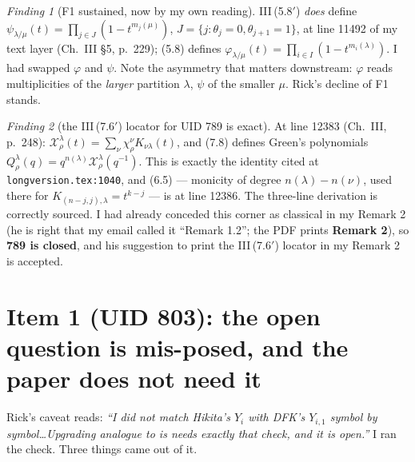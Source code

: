 \documentclass[11pt]{article}
\theoremstyle{remark}
\newtheorem{finding}{Finding}
\begin{document}
\begin{finding}[F1 sustained, now by my own reading]
\textrm{III}\,(5.8$'$) \emph{does} define $\psi_{\lambda/\mu}(t)=\prod_{j\in
J}(1-t^{m_j(\mu)})$, $J=\{j:\theta_j=0,\theta_{j+1}=1\}$, at line 11492 of my text layer
(Ch.~III \S5, p.~229); (5.8) defines $\varphi_{\lambda/\mu}(t)=\prod_{i\in
I}(1-t^{m_i(\lambda)})$. I had swapped $\varphi$ and $\psi$. Note the asymmetry that matters
downstream: $\varphi$ reads multiplicities of the \emph{larger} partition $\lambda$, $\psi$ of
the smaller $\mu$. Rick's decline of F1 stands.
\end{finding}

\begin{finding}[the \textrm{III}\,(7.6$'$) locator for UID 789 is exact]
At line 12383 (Ch.~III, p.~248): $\mathcal X^\lambda_\rho(t)=\sum_\nu\chi^\nu_\rho
K_{\nu\lambda}(t)$, and (7.8) defines Green's polynomials
$Q^\lambda_\rho(q)=q^{n(\lambda)}\mathcal X^\lambda_\rho(q^{-1})$. This is exactly the identity
cited at \texttt{longversion.tex:1040}, and (6.5) --- monicity of degree
$n(\lambda)-n(\nu)$, used there for $K_{(n-j,j),\lambda}=t^{k-j}$ --- is at line 12386. The
three-line derivation is correctly sourced. I had already conceded this corner as classical in
my Remark 2 (he is right that my email called it ``Remark 1.2''; the PDF prints
\textbf{Remark 2}), so \textbf{789 is closed}, and his suggestion to print the
\textrm{III}\,(7.6$'$) locator in my Remark 2 is accepted.
\end{finding}

\section{Item 1 (UID 803): the open question is mis-posed, and the paper does not need it}

Rick's caveat reads: \emph{``I did not match Hikita's $Y_i$ with DFK's $Y_{i,1}$ symbol by
symbol\dots Upgrading analogue to is needs exactly that check, and it is open.''} I ran the
check. Three things came out of it.
\end{document}
